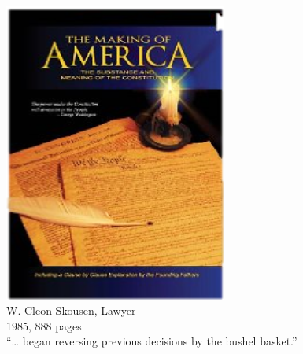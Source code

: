 \begin{frame}
    \begin{columns}[onlytextwidth]
            \centering
            \includegraphics[width=0.75\textwidth]{img/making-of-america.png} \\
            W. Cleon Skousen, Lawyer \\
            1985, 888 pages \\

            ``\ldots {} began reversing previous decisions by the bushel basket.''
    \end{columns}
\end{frame}


